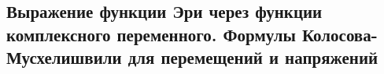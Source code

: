 

\subsection{Выражение функции Эри через функции комплексного переменного. Формулы Колосова-Мусхелишвили для перемещений и напряжений}



